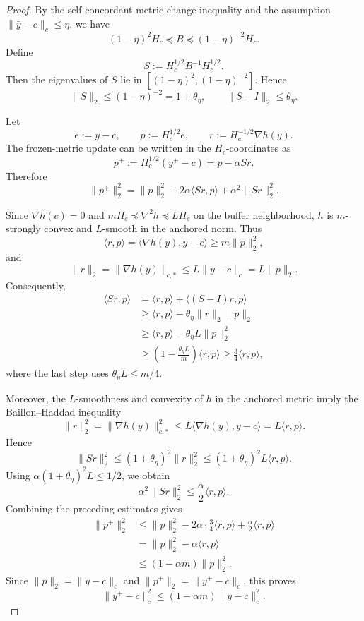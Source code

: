 \documentclass{article}
\begin{document}
\begin{proof}
By the self-concordant metric-change inequality and the assumption
\(\|\bar y-c\|_c\le \eta\), we have
\[
(1-\eta)^2H_c\preceq B\preceq (1-\eta)^{-2}H_c.
\]
Define
\[
S:=H_c^{1/2}B^{-1}H_c^{1/2}.
\]
Then the eigenvalues of \(S\) lie in
\([(1-\eta)^2,(1-\eta)^{-2}]\). Hence
\[
\|S\|_2\le (1-\eta)^{-2}=1+\theta_\eta,
\qquad
\|S-I\|_2\le \theta_\eta.
\]

Let
\[
e:=y-c,\qquad p:=H_c^{1/2}e,\qquad r:=H_c^{-1/2}\nabla h(y).
\]
The frozen-metric update can be written in the \(H_c\)-coordinates as
\[
p^+ := H_c^{1/2}(y^+-c)
=
p-\alpha S r .
\]
Therefore
\[
\|p^+\|_2^2
=
\|p\|_2^2
-2\alpha\langle Sr,p\rangle
+\alpha^2\|Sr\|_2^2.
\]

Since \(\nabla h(c)=0\) and \(mH_c\preceq\nabla^2h\preceq LH_c\) on the buffer neighborhood, \(h\) is
\(m\)-strongly convex and \(L\)-smooth in the anchored norm. Thus
\[
\langle r,p\rangle
=
\langle \nabla h(y),y-c\rangle
\ge
m\|p\|_2^2,
\]
and
\[
\|r\|_2
=
\|\nabla h(y)\|_{c,*}
\le
L\|y-c\|_c
=
L\|p\|_2.
\]
Consequently,
\[
\begin{aligned}
\langle Sr,p\rangle
&=
\langle r,p\rangle+\langle (S-I)r,p\rangle  \\
&\ge
\langle r,p\rangle-\theta_\eta\|r\|_2\|p\|_2 \\
&\ge
\langle r,p\rangle-\theta_\eta L\|p\|_2^2 \\
&\ge
\left(1-\frac{\theta_\eta L}{m}\right)\langle r,p\rangle
\ge
\frac34\langle r,p\rangle,
\end{aligned}
\]
where the last step uses \(\theta_\eta L\le m/4\).

Moreover, the \(L\)-smoothness and convexity of \(h\) in the anchored metric imply the
Baillon--Haddad inequality
\[
\|r\|_2^2
=
\|\nabla h(y)\|_{c,*}^2
\le
L\langle \nabla h(y),y-c\rangle
=
L\langle r,p\rangle.
\]
Hence
\[
\|Sr\|_2^2
\le
(1+\theta_\eta)^2\|r\|_2^2
\le
(1+\theta_\eta)^2L\langle r,p\rangle.
\]
Using \(\alpha(1+\theta_\eta)^2L\le 1/2\), we obtain
\[
\alpha^2\|Sr\|_2^2
\le
\frac{\alpha}{2}\langle r,p\rangle.
\]
Combining the preceding estimates gives
\[
\begin{aligned}
\|p^+\|_2^2
&\le
\|p\|_2^2
-2\alpha\cdot \frac34\langle r,p\rangle
+\frac{\alpha}{2}\langle r,p\rangle  \\
&=
\|p\|_2^2-\alpha\langle r,p\rangle \\
&\le
(1-\alpha m)\|p\|_2^2.
\end{aligned}
\]
Since \(\|p\|_2=\|y-c\|_c\) and \(\|p^+\|_2=\|y^+-c\|_c\), this proves
\[
\|y^+-c\|_c^2\le (1-\alpha m)\|y-c\|_c^2.
\]
\end{proof}
\end{document}
